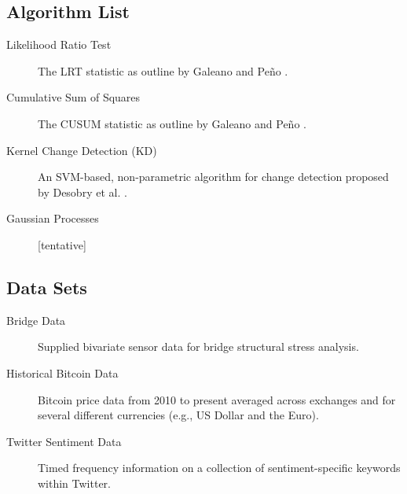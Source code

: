 \documentclass[10pt,letterpaper]{article}
\begin{document}
\subsection{Algorithm List}

\begin{description}
\item[Likelihood Ratio Test] The LRT statistic as outline by Galeano and Pe\~{n}o \cite{galeano2007covariance}.
\item[Cumulative Sum of Squares] The CUSUM statistic as outline by Galeano and Pe\~{n}o \cite{galeano2007covariance}.
\item[Kernel Change Detection (KD)] An SVM-based, non-parametric algorithm for change detection proposed by Desobry et al. \cite{1468491}.
\item[Gaussian Processes] [tentative] \cite{saatcci2010gaussian}
\end{description}

\subsection{Data Sets}

\begin{description}
\item[Bridge Data] Supplied bivariate sensor data for bridge structural stress analysis.
\item[Historical Bitcoin Data] Bitcoin price data from 2010 to present averaged across exchanges and for several different currencies (e.g., US Dollar and the Euro).
\item[Twitter Sentiment Data] Timed frequency information on a collection of sentiment-specific keywords within Twitter.
\end{description}



\end{document}
